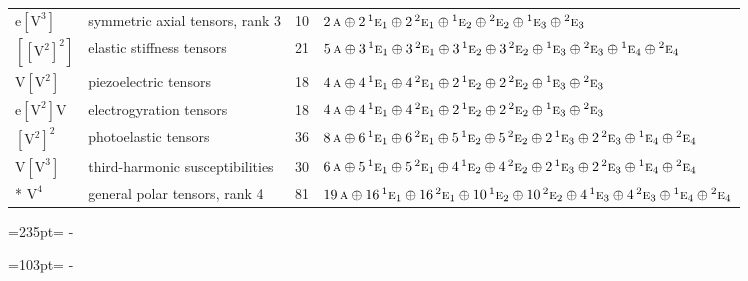 \documentclass[10pt,a4paper]{article}
\newcommand{\needspace}[1]{\par\penalty-100\begingroup\dimen0=#1\relax\dimen2=\pagegoal
  \advance\dimen2-\pagetotal\ifdim\dimen0>\dimen2\relax\ifdim\dimen2>0pt\vfil\break\fi\fi
  \endgroup}
\numberwithin{equation}{section}
\newcommand{\irr}[1]{\text{\normalfont\scshape #1}}
\newcommand{\conjpair}[1]{{}^{#1}}
\newcommand{\jahn}[1]{\mathrm{#1}}
\newlength{\fillwidth}\newlength{\cellwidth}\newlength{\colwidth}
\begin{document}
{\begin{longtable}{@{}llr>{\RaggedRight\arraybackslash}p{\fillwidth}@{}}
$\jahn{e[V^{3}]}$ & symmetric axial tensors, rank 3 & 10 & $2\,\irr{a} \oplus\allowbreak 2\,\conjpair{1}\irr{e}_{1} \oplus\allowbreak 2\,\conjpair{2}\irr{e}_{1} \oplus\allowbreak \conjpair{1}\irr{e}_{2} \oplus\allowbreak \conjpair{2}\irr{e}_{2} \oplus\allowbreak \conjpair{1}\irr{e}_{3} \oplus\allowbreak \conjpair{2}\irr{e}_{3}$\\
$\jahn{[[V^{2}]^{2}]}$ & elastic stiffness tensors & 21 & $5\,\irr{a} \oplus\allowbreak 3\,\conjpair{1}\irr{e}_{1} \oplus\allowbreak 3\,\conjpair{2}\irr{e}_{1} \oplus\allowbreak 3\,\conjpair{1}\irr{e}_{2} \oplus\allowbreak 3\,\conjpair{2}\irr{e}_{2} \oplus\allowbreak \conjpair{1}\irr{e}_{3} \oplus\allowbreak \conjpair{2}\irr{e}_{3} \oplus\allowbreak \conjpair{1}\irr{e}_{4} \oplus\allowbreak \conjpair{2}\irr{e}_{4}$\\
$\jahn{V[V^{2}]}$ & piezoelectric tensors & 18 & $4\,\irr{a} \oplus\allowbreak 4\,\conjpair{1}\irr{e}_{1} \oplus\allowbreak 4\,\conjpair{2}\irr{e}_{1} \oplus\allowbreak 2\,\conjpair{1}\irr{e}_{2} \oplus\allowbreak 2\,\conjpair{2}\irr{e}_{2} \oplus\allowbreak \conjpair{1}\irr{e}_{3} \oplus\allowbreak \conjpair{2}\irr{e}_{3}$\\
$\jahn{e[V^{2}]V}$ & electrogyration tensors & 18 & $4\,\irr{a} \oplus\allowbreak 4\,\conjpair{1}\irr{e}_{1} \oplus\allowbreak 4\,\conjpair{2}\irr{e}_{1} \oplus\allowbreak 2\,\conjpair{1}\irr{e}_{2} \oplus\allowbreak 2\,\conjpair{2}\irr{e}_{2} \oplus\allowbreak \conjpair{1}\irr{e}_{3} \oplus\allowbreak \conjpair{2}\irr{e}_{3}$\\
$\jahn{[V^{2}]^{2}}$ & photoelastic tensors & 36 & $8\,\irr{a} \oplus\allowbreak 6\,\conjpair{1}\irr{e}_{1} \oplus\allowbreak 6\,\conjpair{2}\irr{e}_{1} \oplus\allowbreak 5\,\conjpair{1}\irr{e}_{2} \oplus\allowbreak 5\,\conjpair{2}\irr{e}_{2} \oplus\allowbreak 2\,\conjpair{1}\irr{e}_{3} \oplus\allowbreak 2\,\conjpair{2}\irr{e}_{3} \oplus\allowbreak \conjpair{1}\irr{e}_{4} \oplus\allowbreak \conjpair{2}\irr{e}_{4}$\\
$\jahn{V[V^{3}]}$ & third-harmonic susceptibilities & 30 & $6\,\irr{a} \oplus\allowbreak 5\,\conjpair{1}\irr{e}_{1} \oplus\allowbreak 5\,\conjpair{2}\irr{e}_{1} \oplus\allowbreak 4\,\conjpair{1}\irr{e}_{2} \oplus\allowbreak 4\,\conjpair{2}\irr{e}_{2} \oplus\allowbreak 2\,\conjpair{1}\irr{e}_{3} \oplus\allowbreak 2\,\conjpair{2}\irr{e}_{3} \oplus\allowbreak \conjpair{1}\irr{e}_{4} \oplus\allowbreak \conjpair{2}\irr{e}_{4}$\\*
$\jahn{V^{4}}$ & general polar tensors, rank 4 & 81 & $19\,\irr{a} \oplus\allowbreak 16\,\conjpair{1}\irr{e}_{1} \oplus\allowbreak 16\,\conjpair{2}\irr{e}_{1} \oplus\allowbreak 10\,\conjpair{1}\irr{e}_{2} \oplus\allowbreak 10\,\conjpair{2}\irr{e}_{2} \oplus\allowbreak 4\,\conjpair{1}\irr{e}_{3} \oplus\allowbreak 4\,\conjpair{2}\irr{e}_{3} \oplus\allowbreak \conjpair{1}\irr{e}_{4} \oplus\allowbreak \conjpair{2}\irr{e}_{4}$\\
\bottomrule\end{longtable}}
\needspace{235pt}
\needspace{103pt}
\end{document}
